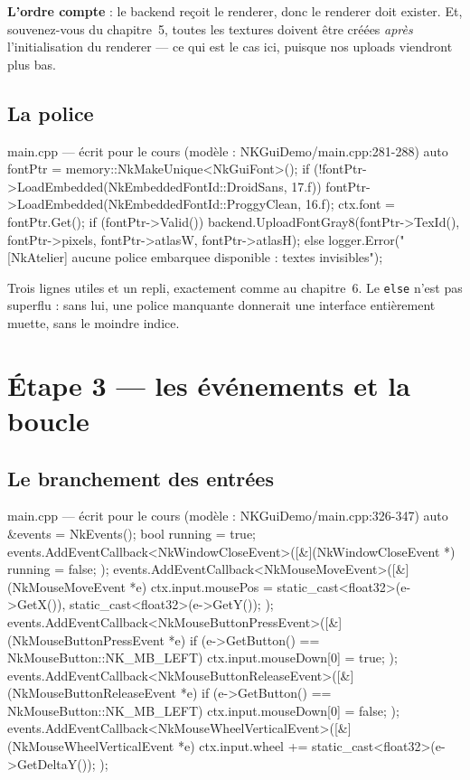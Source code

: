 \textbf{L'ordre compte} : le backend reçoit le renderer, donc le renderer doit
exister. Et, souvenez-vous du chapitre~5, toutes les textures doivent être
créées \emph{après} l'initialisation du renderer — ce qui est le cas ici,
puisque nos uploads viendront plus bas.

\subsection{La police}

\begin{nkcode}{main.cpp — écrit pour le cours (modèle : NKGuiDemo/main.cpp:281-288)}
    auto fontPtr = memory::NkMakeUnique<NkGuiFont>();
    if (!fontPtr->LoadEmbedded(NkEmbeddedFontId::DroidSans, 17.f)) {
        fontPtr->LoadEmbedded(NkEmbeddedFontId::ProggyClean, 16.f);
    }
    ctx.font = fontPtr.Get();
    if (fontPtr->Valid()) {
        backend.UploadFontGray8(fontPtr->TexId(), fontPtr->pixels, fontPtr->atlasW, fontPtr->atlasH);
    } else {
        logger.Error("[NkAtelier] aucune police embarquee disponible : textes invisibles");
    }
\end{nkcode}

Trois lignes utiles et un repli, exactement comme au chapitre~6. Le \texttt{else}
n'est pas superflu : sans lui, une police manquante donnerait une interface
entièrement muette, sans le moindre indice.

\section{Étape 3 — les événements et la boucle}

\subsection{Le branchement des entrées}

\begin{nkcode}{main.cpp — écrit pour le cours (modèle : NKGuiDemo/main.cpp:326-347)}
    auto &events = NkEvents();
    bool running = true;
    events.AddEventCallback<NkWindowCloseEvent>([&](NkWindowCloseEvent *) { running = false; });
    events.AddEventCallback<NkMouseMoveEvent>([&](NkMouseMoveEvent *e) {
        ctx.input.mousePos = {static_cast<float32>(e->GetX()), static_cast<float32>(e->GetY())};
    });
    events.AddEventCallback<NkMouseButtonPressEvent>([&](NkMouseButtonPressEvent *e) {
        if (e->GetButton() == NkMouseButton::NK_MB_LEFT)
            ctx.input.mouseDown[0] = true;
    });
    events.AddEventCallback<NkMouseButtonReleaseEvent>([&](NkMouseButtonReleaseEvent *e) {
        if (e->GetButton() == NkMouseButton::NK_MB_LEFT)
            ctx.input.mouseDown[0] = false;
    });
    events.AddEventCallback<NkMouseWheelVerticalEvent>([&](NkMouseWheelVerticalEvent *e) {
        ctx.input.wheel += static_cast<float32>(e->GetDeltaY());
    });
\end{nkcode}

